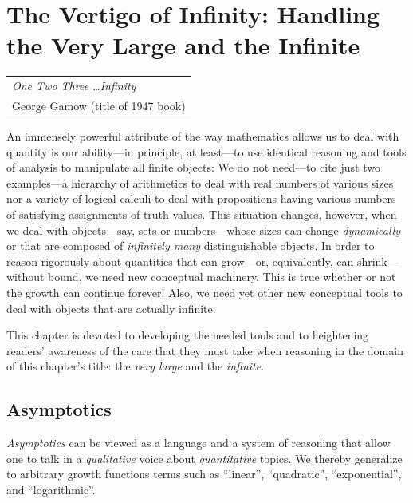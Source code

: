 
\chapter{The Vertigo of Infinity:
Handling the Very Large and the Infinite}
\label{ch:infinity}


\hfill
\begin{tabular}{l}
{\em One Two Three \ldots Infinity} \\
\hfill {\small George Gamow (title of 1947 book)}
\end{tabular}


\vspace*{.5in}

\noindent
An immensely powerful attribute of the way mathematics allows us to deal with quantity is our ability---in principle, at least---to use identical reasoning and tools of analysis to manipulate all finite objects: We do not need---to cite just two examples---a hierarchy of arithmetics to deal with real numbers of various sizes nor a variety of logical calculi to deal with propositions having various numbers of satisfying assignments of truth values.  This situation changes, however, when we deal with objects---say, sets or numbers---whose sizes can change {\em dynamically} or that are composed of {\em infinitely many} distinguishable objects.  In order to reason rigorously about quantities that can grow---or, equivalently, can shrink---without bound, we need new conceptual machinery.  This is true whether or not the growth can continue forever!  Also, we need yet other new conceptual tools to deal with objects that are actually infinite.

\smallskip

This chapter is devoted to developing the needed tools and to heightening readers' awareness of the care that they must take when reasoning in the domain of this chapter's title: the {\em very large} and the {\em infinite}.

\section{Asymptotics}
\label{sec:asymptotics}

{\em Asymptotics} can be viewed as a language and a system of reasoning that allow one to talk in a {\em qualitative} voice about {\em quantitative} topics.  We thereby generalize to arbitrary growth functions terms such as ``linear'', ``quadratic'', ``exponential'', and ``logarithmic''.

